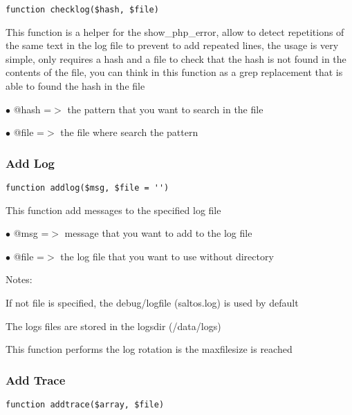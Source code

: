 \documentclass[a4paper]{article}
\begin{document}
\begin{lstlisting}
function checklog($hash, $file)
\end{lstlisting}

This function is a helper for the show\_php\_error, allow to detect repetitions
of the same text in the log file to prevent to add repeated lines, the usage
is very simple, only requires a hash and a file to check that the hash is not
found in the contents of the file, you can think in this function as a grep
replacement that is able to found the hash in the file

\begin{compactitem}
\item[\color{myblue}$\bullet$] @hash =$>$ the pattern that you want to search in the file
\item[\color{myblue}$\bullet$] @file =$>$ the file where search the pattern
\end{compactitem}

\hypertarget{toc163}{}
\subsubsection{Add Log}

\begin{lstlisting}
function addlog($msg, $file = '')
\end{lstlisting}

This function add messages to the specified log file

\begin{compactitem}
\item[\color{myblue}$\bullet$] @msg  =$>$ message that you want to add to the log file
\item[\color{myblue}$\bullet$] @file =$>$ the log file that you want to use without directory
\end{compactitem}

Notes:

If not file is specified, the debug/logfile (saltos.log) is used by default

The logs files are stored in the logsdir (/data/logs)

This function performs the log rotation is the maxfilesize is reached

\hypertarget{toc164}{}
\subsubsection{Add Trace}

\begin{lstlisting}
function addtrace($array, $file)
\end{lstlisting}
\end{document}
